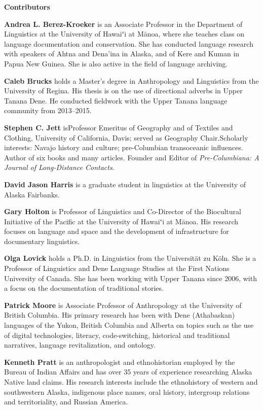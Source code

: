 \thispagestyle{plain}
{\parindent0pt
\parskip6pt


\textbf{\large Contributors}
\vspace{6pt}

\textbf{Andrea L. Berez-Kroeker} is an Associate Professor in the Department of Linguistics at the University of Hawaiʻi at Mānoa, where she teaches class on language documentation and conservation. She has conducted language research with speakers of Ahtna and Dena'ina in Alaska, and of Kere and Kuman in Papua New Guinea. She is also active in the field of language archiving.

\textbf{Caleb Brucks} holds a Master's degree in Anthropology and Linguistics from the University of Regina. His thesis is on the use of directional  adverbs in Upper Tanana Dene. He conducted fieldwork with the Upper  Tanana language community from 2013–2015.

\textbf{Stephen C. Jett} isProfessor Emeritus of Geography and of Textiles and Clothing, University of California, Davis; served as Geography Chair.Scholarly interests: Navajo history and culture; pre-Columbian transoceanic influences. Author of six books and many articles. Founder and Editor of \textit{Pre-Columbiana: A Journal of Long-Distance Contacts}.

\textbf{David Jason Harris} is a graduate student in linguistics at the University of Alaska Fairbanks.

\textbf{Gary Holton} is Professor of Linguistics and Co-Director of the Biocultural Initiative of the Pacific at the University of Hawaiʻi at Mānoa. His research focuses on language and space and the development of infrastructure for documentary linguistics.

\textbf{Olga Lovick} holds a Ph.D. in Linguistics from the Universität zu Köln.  She is a Professor of Linguistics and Dene Language Studies at the First  Nations University of Canada. She has been working with Upper Tanana since 2006, with a focus on the documentation of traditional stories.

\textbf{Patrick Moore} is Associate Professor of Anthropology at the University of British Columbia. His primary research has been with Dene (Athabaskan) languages of the Yukon, British Columbia and Alberta on topics such as the use of digital technologies, literacy, code-switching, historical and traditional narratives, language revitalization, and ontology.

\textbf{Kenneth Pratt} is an anthropologist and ethnohistorian employed by the Bureau of Indian Affairs and has over 35 years of experience researching Alaska Native land claims. His research interests include the ethnohistory of western and southwestern Alaska, indigenous place names, oral history, intergroup relations and territoriality, and Russian America.

}
